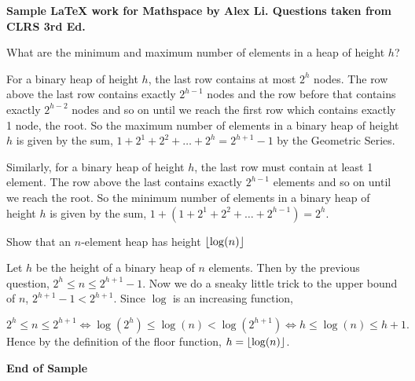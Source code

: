 \documentclass[11pt]{exam}
\DeclarePairedDelimiter\floor{\lfloor}{\rfloor}
\begin{document}
{\bf Sample LaTeX work for Mathspace by Alex Li. Questions taken from CLRS 3rd Ed.}

\vspace{2mm}
 
\begin{questions}
\question What are the minimum and maximum  number of elements in a heap of height $h$?

\begin{solution}
For a binary heap of height $h$, the last row contains at most $2^h$ nodes. The row above the last row contains exactly $2^{h-1}$ nodes and the row before that contains  exactly $2^{h-2}$ nodes and so on until we reach the first row which contains exactly 1 node, the root. So the maximum number of elements in a binary heap of height $h$ is given by the sum, $1+2^{1}+2^{2} + \hdots + 2^{h} = 2^{h+1}-1$ by the Geometric Series.

Similarly, for a binary heap of height $h$, the last row must contain at least 1 element. The row above the last contains exactly $2^{h-1}$ elements and so on until we reach the root. So the minimum number of elements in a binary heap of height $h$ is given by the sum, $1+(1+2^{1}+2^{2}+\hdots + 2^{h-1}) = 2^{h}$.


\end{solution}
\question Show that an $n$-element heap has height $\floor*{\log(n)}$

\begin{solution}
Let $h$ be the height of a binary heap of $n$ elements. Then by the previous question, $2^{h} \leq n \leq 2^{h+1} -1$. Now we do a sneaky little trick to the upper bound of $n$, $2^{h+1}-1 < 2^{h+1}$. Since $\log$ is an increasing function,

$2^h \leq n \leq 2^{h+1} \iff \log(2^{h}) \leq \log(n) < \log(2^{h+1}) \iff h \leq \log(n) \leq h+1.$ Hence by the definition of the floor function, $h=\floor*{\log(n)}$.
\end{solution}

\end{questions}

{\bf End of Sample}

\end{document}
